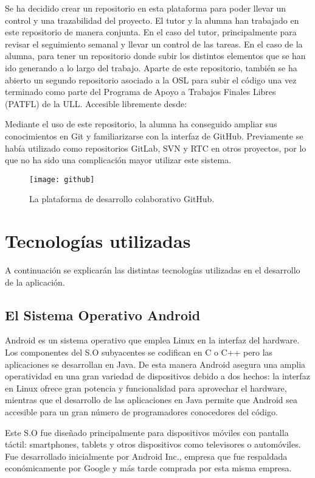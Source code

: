 Se ha decidido crear un repositorio en esta plataforma para poder llevar un control y una trazabilidad del proyecto. El tutor y la alumna han trabajado en este repositorio de manera conjunta. En el caso del tutor, principalmente para revisar el seguimiento semanal y llevar un control de las tareas. En el caso de la alumna, para tener un repositorio donde subir los distintos elementos que se han ido generando a lo largo del trabajo. Aparte de este repositorio, también se ha abierto un segundo repositorio asociado a la OSL para subir el código una vez terminado como parte del Programa de Apoyo a Trabajos Finales Libres (PATFL) \cite{URL::PATFL} de la ULL. Accesible libremente desde: \cite{URL::repositorioAplicacion}


Mediante el uso de este repositorio, la alumna ha conseguido ampliar sus conocimientos en Git y familiarizarse con la interfaz de GitHub. Previamente se había utilizado como repositorios GitLab, SVN y RTC en otros proyectos, por lo que no ha sido una complicación mayor utilizar este sistema.


\begin{figure}[h]
	\centering
	\texttt{[image: github]}
	\caption{La plataforma de desarrollo colaborativo GitHub.}
	\label{fig:github}
\end{figure}

\section{Tecnologías utilizadas}

A continuación se explicarán las distintas tecnologías utilizadas en el desarrollo de la aplicación.

\subsection{El Sistema Operativo Android}

Android es un sistema operativo que emplea Linux en la interfaz del hardware.  Los componentes del S.O subyacentes se codifican en C o C++ pero las aplicaciones se desarrollan en Java. De esta manera Android asegura una amplia operatividad en una gran variedad de dispositivos debido a dos hechos: la interfaz en Linux ofrece gran potencia y funcionalidad para aprovechar el hardware, mientras que el desarrollo de las aplicaciones en Java permite que Android sea accesible para un gran número de programadores conocedores del código.

Este S.O fue diseñado principalmente para dispositivos móviles con pantalla táctil: smartphones, tablets y otros dispositivos como televisores o automóviles. Fue desarrollado inicialmente por Android Inc., empresa que fue respaldada económicamente por Google y más tarde comprada por esta misma empresa.

